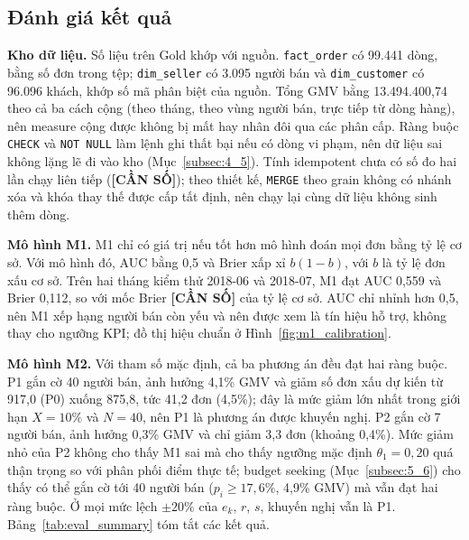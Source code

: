 \documentclass[a4paper]{article}
\begin{document}
\subsection{Đánh giá kết quả}
\label{subsec:6_2}

\textbf{Kho dữ liệu.} Số liệu trên Gold khớp với nguồn. \texttt{fact\_order} có 99.441 dòng, bằng số đơn trong tệp; \texttt{dim\_seller} có 3.095 người bán và \texttt{dim\_customer} có 96.096 khách, khớp số mã phân biệt của nguồn. Tổng GMV bằng 13.494.400,74 theo cả ba cách cộng (theo tháng, theo vùng người bán, trực tiếp từ dòng hàng), nên measure cộng được không bị mất hay nhân đôi qua các phân cấp. Ràng buộc \texttt{CHECK} và \texttt{NOT NULL} làm lệnh ghi thất bại nếu có dòng vi phạm, nên dữ liệu sai không lặng lẽ đi vào kho (Mục~\ref{subsec:4_5}). Tính idempotent chưa có số đo hai lần chạy liên tiếp (\textbf{[CẦN SỐ]}); theo thiết kế, \texttt{MERGE} theo grain không có nhánh xóa và khóa thay thế được cấp tất định, nên chạy lại cùng dữ liệu không sinh thêm dòng.

\textbf{Mô hình M1.} M1 chỉ có giá trị nếu tốt hơn mô hình đoán mọi đơn bằng tỷ lệ cơ sở. Với mô hình đó, AUC bằng 0,5 và Brier xấp xỉ $b(1-b)$, với $b$ là tỷ lệ đơn xấu cơ sở. Trên hai tháng kiểm thử 2018-06 và 2018-07, M1 đạt AUC 0,559 và Brier 0,112, so với mốc Brier \textbf{[CẦN SỐ]} của tỷ lệ cơ sở. AUC chỉ nhỉnh hơn 0,5, nên M1 xếp hạng người bán còn yếu và nên được xem là tín hiệu hỗ trợ, không thay cho ngưỡng KPI; đồ thị hiệu chuẩn ở Hình~\ref{fig:m1_calibration}.

\textbf{Mô hình M2.} Với tham số mặc định, cả ba phương án đều đạt hai ràng buộc. P1 gắn cờ 40 người bán, ảnh hưởng 4,1\% GMV và giảm số đơn xấu dự kiến từ 917,0 (P0) xuống 875,8, tức 41,2 đơn (4,5\%); đây là mức giảm lớn nhất trong giới hạn $X = 10\%$ và $N = 40$, nên P1 là phương án được khuyến nghị. P2 gắn cờ 7 người bán, ảnh hưởng 0,3\% GMV và chỉ giảm 3,3 đơn (khoảng 0,4\%). Mức giảm nhỏ của P2 không cho thấy M1 sai mà cho thấy ngưỡng mặc định $\theta_1 = 0{,}20$ quá thận trọng so với phân phối điểm thực tế; budget seeking (Mục~\ref{subsec:5_6}) cho thấy có thể gắn cờ tới 40 người bán ($p_i \ge 17{,}6\%$, 4,9\% GMV) mà vẫn đạt hai ràng buộc. Ở mọi mức lệch $\pm 20\%$ của $e_k$, $r$, $s$, khuyến nghị vẫn là P1. Bảng~\ref{tab:eval_summary} tóm tắt các kết quả.
\end{document}
